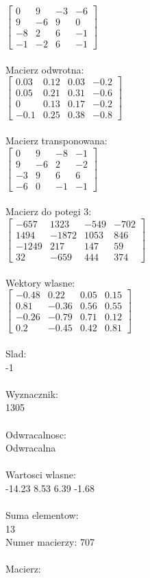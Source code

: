 \documentclass[a4paper,12pt]{article}
\begin{document}
$\begin{bmatrix} 0&9&-3&-6\\9&-6&9&0\\-8&2&6&-1\\-1&-2&6&-1 \end{bmatrix}$
\\
\\
Macierz odwrotna:\\

$\begin{bmatrix} 0.03&0.12&0.03&-0.2\\0.05&0.21&0.31&-0.6\\0&0.13&0.17&-0.2\\-0.1&0.25&0.38&-0.8 \end{bmatrix}$
\\
\\
Macierz transponowana:\\

$\begin{bmatrix} 0&9&-8&-1\\9&-6&2&-2\\-3&9&6&6\\-6&0&-1&-1 \end{bmatrix}$
\\
\\
Macierz do potegi 3:\\

$\begin{bmatrix} -657&1323&-549&-702\\1494&-1872&1053&846\\-1249&217&147&59\\32&-659&444&374 \end{bmatrix}$
\\
\\
Wektory wlasne:\\

$\begin{bmatrix} -0.48&0.22&0.05&0.15\\0.81&-0.36&0.56&0.55\\-0.26&-0.79&0.71&0.12\\0.2&-0.45&0.42&0.81 \end{bmatrix}$
\\
\\
Slad:\\
-1
\\
\\
Wyznacznik:\\
1305
\\
\\
Odwracalnosc:\\
Odwracalna
\\
\\
Wartosci wlasne:\\
-14.23 8.53 6.39 -1.68
\\
\\
Suma elementow:\\
13
\\
\newpage
Numer macierzy:
707
\\
\\
Macierz:\\
\end{document}
